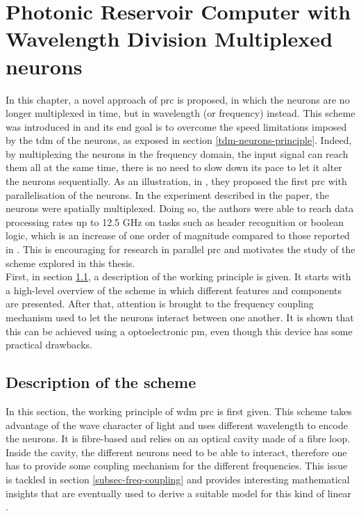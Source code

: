 \chapter{Photonic Reservoir Computer with Wavelength Division Multiplexed neurons}

\label{ch-wdm-rc}

In this chapter, a novel approach of \gls{prc} is proposed, in which the neurons are no longer multiplexed in time, but in wavelength (or frequency) instead. This scheme was introduced in \cite{AkroutAkram2016Pprc} and its end goal is to overcome the speed limitations imposed by the \gls{tdm} of the neurons, as exposed in section \ref{tdm-neurons-principle}. Indeed, by multiplexing the neurons in the frequency domain, the input signal can reach them all at the same time, there is no need to slow down its pace to let it alter the neurons sequentially. As an illustration, in \cite{Vandoorne2014}, they proposed the first \gls{prc} with parallelisation of the neurons. In the experiment described in the paper, the neurons were spatially multiplexed. Doing so, the authors were able to reach data processing rates up to 12.5 GHz on tasks such as header recognition or boolean logic, which is an increase of one order of magnitude compared to those reported in \cite{Vinckier2015}. This is encouraging for research in parallel \gls{prc} and motivates the study of the scheme explored in this thesis.\\

First, in section \ref{sec-scheme-wdm}, a description of the working principle is given. It starts with a high-level overview of the scheme in which different features and components are presented. After that, attention is brought to the frequency coupling mechanism used to let the neurons interact between one another. It is shown that this can be achieved using a optoelectronic \gls{pm}, even though this device has some practical drawbacks. 


\section{Description of the scheme}

\label{sec-scheme-wdm}

In this section, the working principle of \gls{wdm} \gls{prc} is first given. This scheme takes advantage of the wave character of light and uses different wavelength to encode the neurons. It is fibre-based and relies on an optical cavity made of a fibre loop. Inside the cavity, the different neurons need to be able to interact, therefore one has to provide some coupling mechanism for the different frequencies. This issue is tackled in section \ref{subsec-freq-coupling} and provides interesting mathematical insights that are eventually used to derive a suitable model for this kind of linear \rcer.

